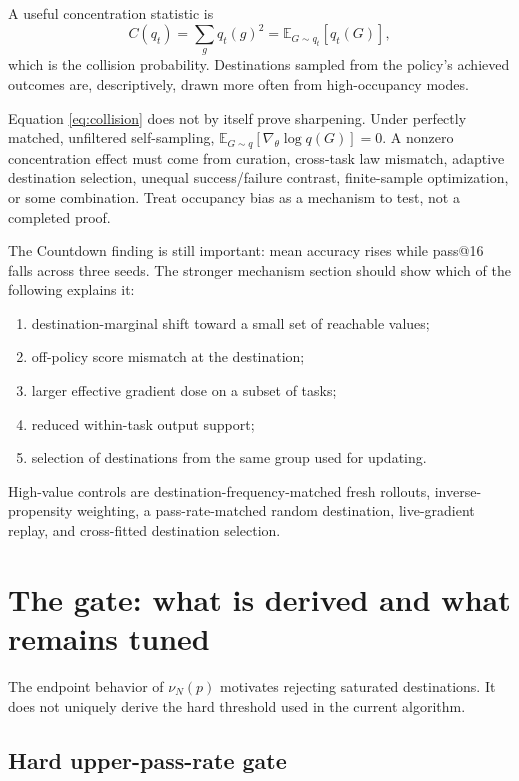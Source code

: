 \documentclass[11pt]{article}
\newcommand{\E}{\mathbb{E}}
\newcommand{\grad}{\nabla_{\!\theta}}
\theoremstyle{definition}
\theoremstyle{remark}
\begin{document}
A useful concentration statistic is
\begin{equation}
C(q_t)=\sum_g q_t(g)^2
=\E_{G\sim q_t}[q_t(G)],
\label{eq:collision}
\end{equation}
which is the collision probability. Destinations sampled from the policy's achieved outcomes are, descriptively, drawn more often from high-occupancy modes.

\begin{evidencebox}
Equation \cref{eq:collision} does not by itself prove sharpening. Under perfectly matched, unfiltered self-sampling, $\E_{G\sim q}[\grad\log q(G)]=0$. A nonzero concentration effect must come from curation, cross-task law mismatch, adaptive destination selection, unequal success/failure contrast, finite-sample optimization, or some combination. Treat occupancy bias as a mechanism to test, not a completed proof.
\end{evidencebox}

The Countdown finding is still important: mean accuracy rises while pass@16 falls across three seeds. The stronger mechanism section should show which of the following explains it:

\begin{enumerate}[leftmargin=2em]
\item destination-marginal shift toward a small set of reachable values;
\item off-policy score mismatch at the destination;
\item larger effective gradient dose on a subset of tasks;
\item reduced within-task output support;
\item selection of destinations from the same group used for updating.
\end{enumerate}

High-value controls are destination-frequency-matched fresh rollouts, inverse-propensity weighting, a pass-rate-matched random destination, live-gradient replay, and cross-fitted destination selection.

\section{The gate: what is derived and what remains tuned}

The endpoint behavior of $\nu_N(p)$ motivates rejecting saturated destinations. It does not uniquely derive the hard threshold used in the current algorithm.

\subsection{Hard upper-pass-rate gate}
\end{document}
